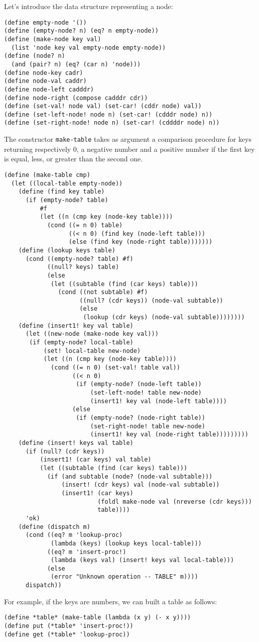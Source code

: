 \documentclass[a4paper,12pt]{article}
\begin{document}
Let's introduce the data structure representing a node:
\begin{lstlisting}
(define empty-node '())
(define (empty-node? n) (eq? n empty-node))
(define (make-node key val)
  (list 'node key val empty-node empty-node))
(define (node? n)
  (and (pair? n) (eq? (car n) 'node)))
(define node-key cadr)
(define node-val caddr)
(define node-left cadddr)
(define node-right (compose cadddr cdr))
(define (set-val! node val) (set-car! (cddr node) val))
(define (set-left-node! node n) (set-car! (cdddr node) n))
(define (set-right-node! node n) (set-car! (cddddr node) n))
\end{lstlisting}
The constructor \lstinline!make-table! takes as argument a comparison
procedure for keys returning respectively 0, a negative number and a
positive number if the first key is equal, less, or greater than the
second one.
\begin{lstlisting}
(define (make-table cmp)
  (let ((local-table empty-node))
    (define (find key table)
      (if (empty-node? table)
          #f
          (let ((n (cmp key (node-key table))))
            (cond ((= n 0) table)
                  ((< n 0) (find key (node-left table)))
                  (else (find key (node-right table)))))))
    (define (lookup keys table)
      (cond ((empty-node? table) #f)
            ((null? keys) table)
            (else
             (let ((subtable (find (car keys) table)))
               (cond ((not subtable) #f)
                     ((null? (cdr keys)) (node-val subtable))
                     (else
                      (lookup (cdr keys) (node-val subtable))))))))
    (define (insert1! key val table)
      (let ((new-node (make-node key val)))
       (if (empty-node? local-table)
           (set! local-table new-node)
           (let ((n (cmp key (node-key table))))
             (cond ((= n 0) (set-val! table val))
                   ((< n 0)
                    (if (empty-node? (node-left table))
                        (set-left-node! table new-node)
                        (insert1! key val (node-left table))))
                   (else
                    (if (empty-node? (node-right table))
                        (set-right-node! table new-node)
                        (insert1! key val (node-right table)))))))))
    (define (insert! keys val table)
      (if (null? (cdr keys))
          (insert1! (car keys) val table)
          (let ((subtable (find (car keys) table)))
            (if (and subtable (node? (node-val subtable)))
                (insert! (cdr keys) val (node-val subtable)) 
                (insert1! (car keys)
                          (foldl make-node val (nreverse (cdr keys)))
                          table))))
      'ok)
    (define (dispatch m)
      (cond ((eq? m 'lookup-proc)
             (lambda (keys) (lookup keys local-table)))
            ((eq? m 'insert-proc!)
             (lambda (keys val) (insert! keys val local-table)))
            (else
             (error "Unknown operation -- TABLE" m))))
      dispatch))
\end{lstlisting}
For example, if the keys are numbers, we can built a table as follows:
\begin{lstlisting}
(define *table* (make-table (lambda (x y) (- x y))))
(define put (*table* 'insert-proc!))
(define get (*table* 'lookup-proc))
\end{lstlisting}
\end{document}
